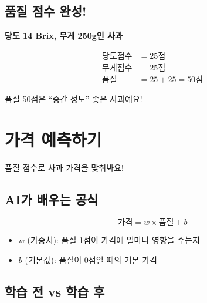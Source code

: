 \documentclass[12pt,a4paper]{article}
\begin{document}
\subsection{ 품질 점수 완성!}

\begin{tcolorbox}[colback=lightgreen,colframe=green!50!black,title=\textbf{종합 예시}]
\textbf{당도 14 Brix, 무게 250g인 사과}

\large
\begin{align}
\text{당도점수} &= 25\text{점} \\
\text{무게점수} &= 25\text{점} \\[0.3em]
\text{품질} &= 25 + 25 = \boxed{50\text{점}}
\end{align}
\normalsize

 품질 50점은 ``중간 정도'' 좋은 사과예요!
\end{tcolorbox}

\section{ 가격 예측하기}

품질 점수로 사과 가격을 맞춰봐요!

\subsection{ AI가 배우는 공식}

\begin{tcolorbox}[colback=lightcyan,colframe=teal,title=\textbf{\texttwemoji{robot} AI의 예측 공식}]
\Large
\begin{equation}
\boxed{\text{가격} = w \times \text{품질} + b}
\end{equation}
\normalsize

\begin{itemize}
    \item $w$ (가중치): 품질 1점이 가격에 얼마나 영향을 주는지
    \item $b$ (기본값): 품질이 0점일 때의 기본 가격
\end{itemize}
\end{tcolorbox}

\subsection{ 학습 전 vs 학습 후}
\end{document}
